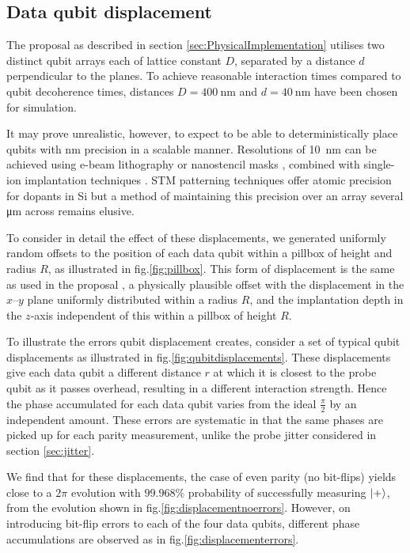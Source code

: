 
\subsection{Data qubit displacement}
The proposal \cite{OGorman2016} as described in section \ref{sec:PhysicalImplementation} utilises two distinct qubit arrays each of lattice constant $D$, separated by a distance $d$ perpendicular to the planes. To achieve reasonable interaction times compared to qubit decoherence times, distances $D = \SI{400}{\nano\metre}$ and $d = \SI{40}{\nano\metre}$ have been chosen for simulation.

It may prove unrealistic, however, to expect to be able to deterministically place qubits with \si{\nano\metre} precision in a scalable manner. Resolutions of \SI{10}{\nano\metre} can be achieved using e-beam lithography \cite{Vieu2000a} or nanostencil masks \cite{Weis2008}, combined with single-ion implantation techniques \cite{Jamieson2005}. STM patterning techniques offer atomic precision for dopants in Si \cite{Schofield2003} but a method of maintaining this precision over an array several \si{\micro\metre} across remains elusive. 

To consider in detail the effect of these displacements, we generated uniformly random offsets to the position of each data qubit within a pillbox of height and radius $R$, as illustrated in fig.\@ \ref{fig:pillbox}. This form of displacement is the same as used in the proposal \cite{OGorman2016}, a physically plausible offset with the displacement in the $x$--$y$ plane uniformly distributed within a radius $R$, and the implantation depth in the $z$-axis independent of this within a pillbox of height $R$.

To illustrate the errors qubit displacement creates, consider a set of typical qubit displacements as illustrated in fig.\@ \ref{fig:qubitdisplacements}. These displacements give each data qubit a different distance $r$ at which it is closest to the probe qubit as it passes overhead, resulting in a different interaction strength. Hence the phase accumulated for each data qubit varies from the ideal $\tfrac{\pi}{2}$ by an independent amount. These errors are systematic in that the same phases are picked up for each parity measurement, unlike the probe jitter considered in section \ref{sec:jitter}.

We find that for these displacements, the case of even parity (no bit-flips) yields close to a $2\pi$ evolution with $99.968\%$ probability of successfully measuring $\ket{+}$, from the evolution shown in fig.\@ \ref{fig:displacementnoerrors}. However, on introducing bit-flip errors to each of the four data qubits, different phase accumulations are observed as in fig.\@ \ref{fig:displacementerrors}.


